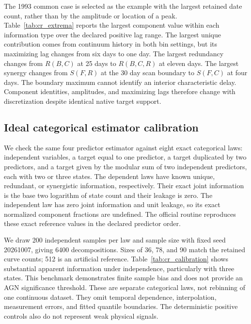 The 1993 common case is selected as the example with the largest retained
date count, rather than by the amplitude or location of a peak.
Table~\ref{tab:cr_extrema} reports the largest component value within each
information type over the declared positive lag range.
The largest unique contribution comes from continuum history in both
bin settings, but its maximizing lag changes from six days to one day.
The largest redundancy changes from $R(B,C)$ at 25 days to $R(B,C,R)$
at eleven days. The largest synergy changes from $S(F,R)$ at the
30 day scan boundary to $S(F,C)$ at four days. The boundary maximum
cannot identify an interior characteristic delay. Component identities,
amplitudes, and maximizing lags therefore change with discretization
despite identical native target support.

\begin{table}[H]
\centering
\caption{Descriptive maxima in the 1993 common scenario with 90 fixed
continuum target dates. Each row maximizes over all components of the
specified type and all base lags from one through 30 days. These maxima
have no null calibration or delay uncertainty and are not physical lag
measurements.}
\label{tab:cr_extrema}
\small

\end{table}

\subsection{Ideal categorical estimator calibration}

We check the same four predictor estimator against eight exact categorical
laws: independent variables, a target equal to one predictor, a target
duplicated by two predictors, and a target given by the modular sum of two
independent predictors, each with two or three states. The dependent laws
have known unique, redundant, or synergistic information, respectively.
Their exact joint information is the base two logarithm of state count
and their leakage is zero. The independent law has zero joint information
and unit leakage, so its exact normalized component fractions are undefined.
The official routine reproduces these exact reference values in the
declared predictor order.

We draw 200 independent samples per law and sample size with fixed seed
20261007, giving 6400 decompositions. Sizes of 36, 78, and 90 match
the retained curve counts; 512 is an artificial reference.
Table~\ref{tab:cr_calibration} shows substantial apparent information under
independence, particularly with three states. This benchmark demonstrates
finite sample bias and does not provide an AGN significance threshold.
These are separate categorical laws, not rebinning of one continuous
dataset. They omit temporal dependence, interpolation, measurement errors,
and fitted quantile boundaries. The deterministic positive controls also
do not represent weak physical signals.

